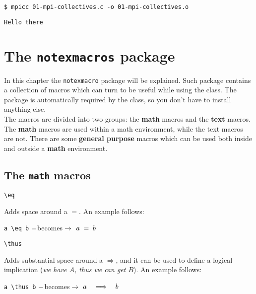 \documentclass[]{notex}
\newcommand{\becomes}[1]{\hspace{#1} $\--$becomes$\rightarrow$ \hspace{#1}}
\begin{document}
\begin{terminal}
    \begin{lstlisting}[style = notexterm]
$ mpicc 01-mpi-collectives.c -o 01-mpi-collectives.o\end{lstlisting}
\end{terminal}

\texttt{Hello there}


\chapter{The \texttt{notexmacros} package}

\noindent In this chapter the \texttt{notexmacro} package will be explained. Such package contains a collection of macros which can turn to be useful while using the class. The package is automatically required by the class, so you don't have to install anything else.
\\
\indent The macros are divided into two groups: the \textbf{math} macros and the \textbf{text} macros. The \textbf{math} macros are used within a math environment, while the text macros are not. There are some \textbf{general purpose} macros which can be used both inside and outside a \textbf{math} environment.

\section{The \texttt{math} macros}

\begin{tcolorbox}
    \verb|\eq|
\end{tcolorbox}

\noindent Adds space around a $=$. An example follows:
\begin{center}
    \verb|a \eq b| \becomes{20pt} $a \; = \; b$
\end{center}

\begin{tcolorbox}
    \verb|\thus|
\end{tcolorbox}

\noindent Adds substantial space around a $\Longrightarrow$, and it can be used to define a logical implication (\textit{we have $A$, thus we can get $B$}). An example follows:
\begin{center}
    \verb|a \thus b| \becomes{20pt} $a \quad \Longrightarrow \quad b$
\end{center}
\end{document}
